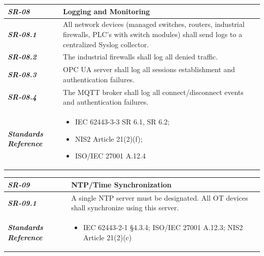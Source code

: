 \documentclass[11pt,a4paper]{article}
\begin{document}
\begin{tabularx}{\textwidth}{>{\bfseries}p{2.5cm} X}
    \textit{SR-08} & \textbf{Logging and Monitoring} \vspace{0.5em}\\
\toprule
\textit{SR-08.1} &
    All network devices (managed switches, routers, industrial firewalls, PLC's with switch modules) shall send logs to a centralized Syslog collector.
    \vspace{0.5em}
\\
\textit{SR-08.2} &
    The industrial firewalls shall log all denied traffic.
    \vspace{0.5em}
    \\
\textit{SR-08.3} &
    OPC UA server shall log all sessions establishment and authentication failures.
    \vspace{0.5em}
    \\
\textit{SR-08.4} &
    The MQTT broker shall log all connect/disconnect events and authentication failures.
    \vspace{0.5em}
    \\
\midrule
    \textit{Standards Reference} &
\begin{itemize}[label=-, noitemsep, topsep=0pt, leftmargin=*]
    \item IEC 62443-3-3 SR 6.1, SR 6.2;
    \item NIS2 Article 21(2)(f); 
    \item ISO/IEC 27001 A.12.4
\end{itemize} \vspace{1em} \\ 
\end{tabularx}
\vspace{2em}

\begin{tabularx}{\textwidth}{>{\bfseries}p{2.5cm} X}
    \textit{SR-09} & \textbf{NTP/Time Synchronization} \vspace{0.5em}\\
\toprule
\textit{SR-09.1} &
    A single NTP server must be designated. All OT devices shall synchronize using this server.
    \vspace{0.5em}
\\
\midrule
    \textit{Standards Reference} &
\begin{itemize}[label=-, noitemsep, topsep=0pt, leftmargin=*]
    \item IEC 62443-2-1 §4.3.4; ISO/IEC 27001 A.12.3; NIS2 Article 21(2)(c)
\end{itemize} \vspace{1em} \\ 
\end{tabularx}
\vspace{2em}
\end{document}
